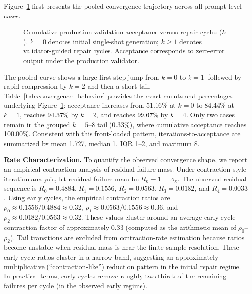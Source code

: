 Figure~\ref{fig:cumulative_convergence} first presents the pooled convergence trajectory across all prompt-level cases.

\begin{figure}[H]
\centering

\caption{Cumulative production-validation acceptance versus repair cycles ($k$). $k=0$ denotes initial single-shot generation; $k\geq 1$ denotes validator-guided repair cycles. Acceptance corresponds to zero-error output under the production validator.}
\label{fig:cumulative_convergence}
\end{figure}

The pooled curve shows a large first-step jump from $k=0$ to $k=1$, followed by rapid compression by $k=2$ and then a short tail. Table~\ref{tab:convergence_behavior} provides the exact counts and percentages underlying Figure~\ref{fig:cumulative_convergence}: acceptance increases from 51.16\% at $k=0$ to 84.44\% at $k=1$, reaches 94.37\% by $k=2$, and reaches 99.67\% by $k=4$. Only two cases remain in the grouped $k=5$--$8$ tail (0.33\%), where cumulative acceptance reaches 100.00\%. Consistent with this front-loaded pattern, iterations-to-acceptance are summarized by mean 1.727, median 1, IQR 1--2, and maximum 8.



\noindent\textbf{Rate Characterization.} To quantify the observed convergence shape, we report an empirical contraction analysis of residual failure mass. Under contraction-style iteration analysis, let residual failure mass be $R_k = 1 - A_k$. The observed residual sequence is $R_0=0.4884$, $R_1=0.1556$, $R_2=0.0563$, $R_3=0.0182$, and $R_4=0.0033$. Using early cycles, the empirical contraction ratios are $\rho_0 \approx 0.1556/0.4884 \approx 0.32$, $\rho_1 \approx 0.0563/0.1556 \approx 0.36$, and $\rho_2 \approx 0.0182/0.0563 \approx 0.32$. These values cluster around an average early-cycle contraction factor of approximately 0.33 (computed as the arithmetic mean of $\rho_0$--$\rho_2$). Tail transitions are excluded from contraction-rate estimation because ratios become unstable when residual mass is near the finite-sample resolution. These early-cycle ratios cluster in a narrow band, suggesting an approximately multiplicative (``contraction-like'') reduction pattern in the initial repair regime. In practical terms, early cycles remove roughly two-thirds of the remaining failures per cycle (in the observed early regime).

